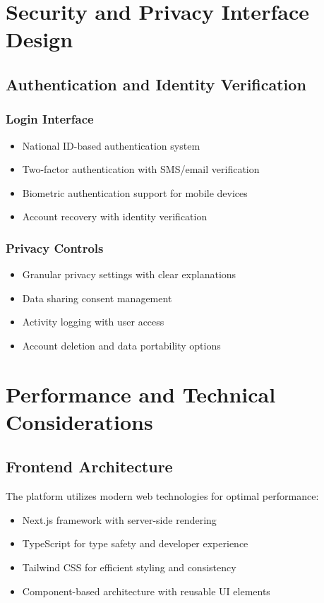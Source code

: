 \documentclass[12pt,a4paper]{article}
\begin{document}
\section{Security and Privacy Interface Design}

\subsection{Authentication and Identity Verification}

\subsubsection{Login Interface}
\begin{itemize}
    \item National ID-based authentication system
    \item Two-factor authentication with SMS/email verification
    \item Biometric authentication support for mobile devices
    \item Account recovery with identity verification
\end{itemize}

\subsubsection{Privacy Controls}
\begin{itemize}
    \item Granular privacy settings with clear explanations
    \item Data sharing consent management
    \item Activity logging with user access
    \item Account deletion and data portability options
\end{itemize}

\section{Performance and Technical Considerations}

\subsection{Frontend Architecture}

The platform utilizes modern web technologies for optimal performance:

\begin{itemize}
    \item Next.js framework with server-side rendering
    \item TypeScript for type safety and developer experience
    \item Tailwind CSS for efficient styling and consistency
    \item Component-based architecture with reusable UI elements
\end{itemize}
\end{document}
